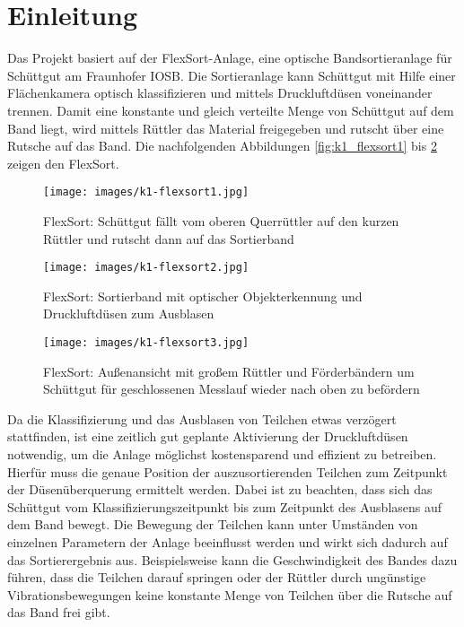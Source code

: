 \section{Einleitung}

Das Projekt basiert auf der FlexSort-Anlage, eine optische Bandsortieranlage für Schüttgut am Fraunhofer IOSB. Die Sortieranlage kann Schüttgut mit Hilfe einer Flächenkamera optisch klassifizieren und mittels Druckluftdüsen voneinander trennen. Damit eine konstante und gleich verteilte Menge von Schüttgut auf dem Band liegt, wird mittels Rüttler das Material freigegeben und rutscht über eine Rutsche auf das Band. Die nachfolgenden Abbildungen \ref{fig:k1_flexsort1} bis \ref{fig:k1_flexsort3} zeigen den FlexSort.

\begin{figure}[htb]
	\centering
	\begin{minipage}[t]{0.4\linewidth}
		\centering
		\texttt{[image: images/k1-flexsort1.jpg]}
		\caption{FlexSort: Schüttgut fällt vom oberen Querrüttler auf den kurzen Rüttler und rutscht dann auf das Sortierband}
		\label{fig:k1_flexsort1}
	\end{minipage}%
	\hfill
	\begin{minipage}[t]{0.54\linewidth}
		\centering
		\texttt{[image: images/k1-flexsort2.jpg]}
		\caption{FlexSort: Sortierband mit optischer Objekterkennung und Druckluftdüsen zum Ausblasen}
		\label{fig:k1_flexsort2}
	\end{minipage}
\end{figure}

\begin{figure}[htb]
	\centering
	\texttt{[image: images/k1-flexsort3.jpg]}
	\caption{FlexSort: Außenansicht mit großem Rüttler und Förderbändern um Schüttgut für geschlossenen Messlauf wieder nach oben zu befördern}
	\label{fig:k1_flexsort3}
\end{figure}
 
Da die Klassifizierung und das Ausblasen von Teilchen etwas verzögert stattfinden, ist eine zeitlich gut geplante Aktivierung der Druckluftdüsen notwendig, um die Anlage möglichst kostensparend und effizient zu betreiben. Hierfür muss die genaue Position der auszusortierenden Teilchen zum Zeitpunkt der Düsenüberquerung ermittelt werden. Dabei ist zu beachten, dass sich das Schüttgut vom Klassifizierungszeitpunkt bis zum Zeitpunkt des Ausblasens auf dem Band bewegt. Die Bewegung der Teilchen kann unter Umständen von einzelnen Parametern der Anlage beeinflusst werden und wirkt sich dadurch auf das Sortierergebnis aus. Beispielsweise kann die Geschwindigkeit des Bandes dazu führen, dass die Teilchen darauf springen oder der Rüttler durch ungünstige Vibrationsbewegungen keine konstante Menge von Teilchen über die Rutsche auf das Band frei gibt. 

